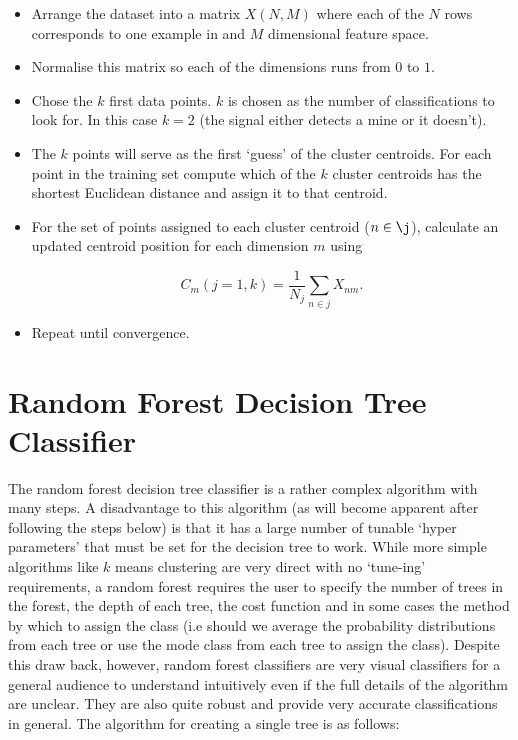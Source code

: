 \documentclass[10pt]{article}
\begin{document}
\begin{itemize}
\item Arrange the dataset into a matrix $X(N,M)$ where each of the $N$ rows corresponds to one example in and $M$ dimensional feature space.

\item Normalise this matrix so each of the dimensions runs from $0$ to $1$.

\item Chose the $k$ first data points. $k$ is chosen as the number of classifications to look for. In this case $k=2$ (the signal either detects a mine or it doesn't).

\item The $k$ points will serve as the first `guess' of the cluster centroids. For each point in the training set compute which of the $k$ cluster centroids has the shortest Euclidean distance and assign it to that centroid.

\item For the set of points assigned to each cluster centroid ($n \in \j$), calculate an updated centroid position for each dimension $m$ using

\begin{equation}
C_m (j=1,k) = \frac{1}{N_j}\sum_{n \in j} X_{nm}.
\label{eq_km_update}
\end{equation}

\item Repeat until convergence.

\end{itemize}



\section{Random Forest Decision Tree Classifier}
\label{sec_rf}


The random forest decision tree classifier is a rather complex algorithm with many steps. A disadvantage to this algorithm (as will become apparent after following the steps below) is that it has a large number of tunable `hyper parameters' that must be set for the decision tree to work. While more simple algorithms like $k$ means clustering are very direct with no `tune-ing' requirements, a random forest requires the user to specify the number of trees in the forest, the depth of each tree, the cost function and in some cases the method by which to assign the class (i.e should we average the probability distributions from each tree or use the mode class from each tree to assign the class). Despite this draw back, however, random forest classifiers are very visual classifiers for a general audience to understand intuitively even if the full details of the algorithm are unclear. They are also quite robust and provide very accurate classifications in general. The algorithm for creating a single tree is as follows:
\end{document}
